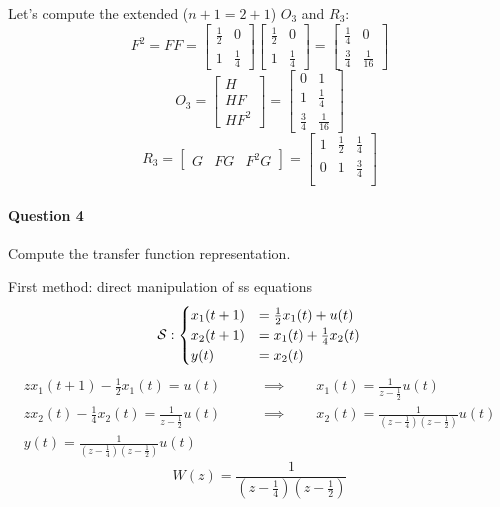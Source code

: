 \begin{example}
    Let's compute the extended ($n+1 = 2+1$) $O_3$ and $R_3$:
    \[
        F^{2} = F F = 
        \begin{bmatrix}
            \frac{1}{2} & 0 \\
            1 & \frac{1}{4} 
        \end{bmatrix} 
        \begin{bmatrix}
            \frac{1}{2} & 0 \\
            1 & \frac{1}{4} 
        \end{bmatrix} = 
        \begin{bmatrix}
            \frac{1}{4} & 0 \\
            \frac{3}{4} & \frac{1}{16} 
        \end{bmatrix}
    \]
    \[
        O_3 = \begin{bmatrix}
            H \\ HF \\ HF^2
        \end{bmatrix} = \begin{bmatrix}
            0 & 1 \\
            1 & \frac{1}{4} \\
            \frac{3}{4} & \frac{1}{16}
        \end{bmatrix}
    \]
    \[
        R_3 = \begin{bmatrix}
            G & FG & F^2G
        \end{bmatrix} = \begin{bmatrix}
            1 & \frac{1}{2} & \frac{1}{4} \\
            0 & 1 & \frac{3}{4} \\
        \end{bmatrix}
    \]

    \paragraph{Question 4} Compute the transfer function representation.

    First method: direct manipulation of \gls{ss} equations
    \[
        \mathcal{S}:
        \begin{cases}
            x_1(t+1) &= \frac{1}{2}x_1(t) + u(t) \\
            x_2(t+1) &= x_1(t) + \frac{1}{4}x_2(t) \\
            y(t) &= x_2(t)
        \end{cases}
    \]
    \begin{align*}
        zx_1(t+1) - \frac{1}{2}x_1(t) = u(t) \qquad &\implies \qquad x_1(t) = \frac{1}{z-\frac{1}{2}}u(t) \\
        zx_2(t) - \frac{1}{4}x_2(t) = \frac{1}{z-\frac{1}{2}}u(t) \qquad &\implies \qquad x_2(t) = \frac{1}{(z-\frac{1}{4})(z-\frac{1}{2})}u(t) \\
        y(t) = \frac{1}{(z-\frac{1}{4})(z-\frac{1}{2})}u(t)
    \end{align*}
    \[
        W(z) = \frac{1}{(z-\frac{1}{4})(z-\frac{1}{2})}
    \]


\end{example}
